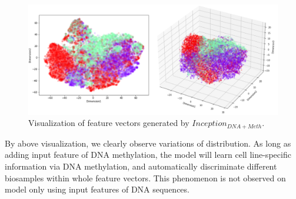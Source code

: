 \begin{figure}[H]
    \centering
    \includegraphics[width=1\columnwidth]{body/figure/figure19.png}
    \captionsetup{labelfont=bf}
    \renewcommand{\baselinestretch}{1.0}
    \caption[Visualization of feature vectors generated by $Inception_{DNA+Meth}$]{Visualization of feature vectors generated by $Inception_{DNA+Meth}$.}
    \label{f19}
\end{figure}

By above visualization, we clearly observe variations of distribution. As long as adding input feature of DNA methylation, the model will learn cell line-specific information via DNA methylation, and automatically discriminate different biosamples within whole feature vectors. This phenomenon is not observed on model only using input features of DNA sequences.